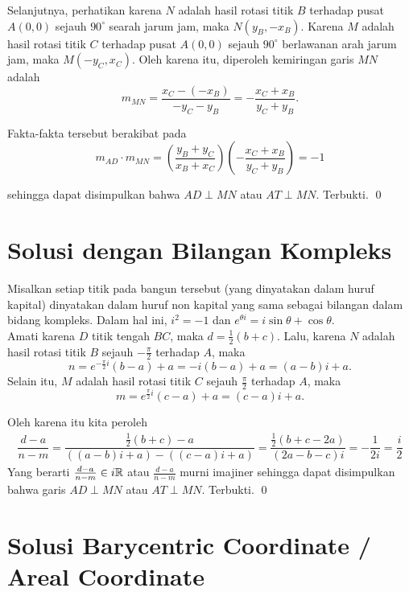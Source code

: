 \documentclass[a4paper, 12pt]{scrartcl}
\begin{document}
Selanjutnya, perhatikan karena $N$ adalah hasil rotasi titik $B$ terhadap pusat $A(0,0)$ sejauh $90^\circ$ searah jarum jam, maka $N(y_B,-x_B)$. Karena $M$ adalah hasil rotasi titik $C$ terhadap pusat $A(0,0)$ sejauh $90^\circ$ berlawanan arah jarum jam, maka $M(-y_C,x_C)$. Oleh karena itu, diperoleh kemiringan garis $MN$ adalah 
$$m_{MN}=\dfrac{x_C-(-x_B)}{-y_C-y_B}=-\dfrac{x_C+x_B}{y_C+y_B}.$$

Fakta-fakta tersebut berakibat pada
$$m_{AD} \cdot m_{MN} = \left(\dfrac{y_B+y_C}{x_B+x_C}\right) \left(-\dfrac{x_C+x_B}{y_C+y_B}\right) = -1$$

sehingga dapat disimpulkan bahwa $AD \perp MN$ atau $AT \perp MN$. Terbukti. \qed

\newpage
\section{Solusi dengan Bilangan Kompleks}
Misalkan setiap titik pada bangun tersebut (yang dinyatakan dalam huruf kapital) dinyatakan dalam huruf non kapital yang sama sebagai bilangan dalam bidang kompleks. Dalam hal ini, $i^2=-1$ dan $e^{\theta i} = i \sin \theta + \cos \theta$.\\


Amati karena $D$ titik tengah $BC$, maka $d=\frac{1}{2}(b+c)$. Lalu, karena $N$ adalah hasil rotasi titik $B$ sejauh $-\frac{\pi}{2}$ terhadap $A$, maka $$n=e^{-\frac{\pi}{2}i}(b-a)+a=-i(b-a)+a=(a-b)i+a.$$ Selain itu, $M$ adalah hasil rotasi titik $C$ sejauh $\frac{\pi}{2}$ terhadap $A$, maka $$m=e^{\frac{\pi}{2}i}(c-a)+a=(c-a)i+a.$$


Oleh karena itu kita peroleh
\begin{equation*}
\begin{split}
\dfrac{d-a}{n-m}= \dfrac{\frac{1}{2}(b+c)-a}{((a-b)i+a)-((c-a)i+a)}
= \dfrac{\frac{1}{2}(b+c-2a)}{(2a-b-c)i}
= -\dfrac{1}{2i}=\dfrac{i}{2}
\end{split}
\end{equation*}
Yang berarti $\frac{d-a}{n-m} \in i\mathbb R$ atau  $\frac{d-a}{n-m}$ murni imajiner sehingga dapat disimpulkan bahwa garis $AD \perp MN$ atau $AT \perp MN$. Terbukti. \qed

\newpage
\section{Solusi Barycentric Coordinate / Areal Coordinate}
\end{document}
